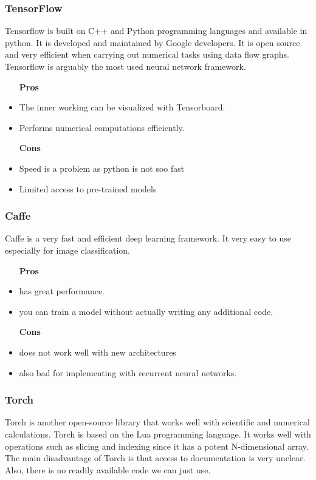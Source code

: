 \documentclass[12pt, a4paper,oneside]{report}
\begin{document}
\subsubsection{TensorFlow}
Tensorflow is built on C++ and Python programming languages and available in python. It is developed and maintained by Google developers.  It is open source and very efficient when carrying out numerical tasks using data flow graphs. Tensorflow is arguably the most used neural network framework.

\begin{itemize}
	\item [\textbf{Pros}]
	\item The inner working can be visualized with Tensorboard.
	\item Performs numerical computations efficiently.
	
	\item [\textbf{Cons}]
	\item Speed is a problem as python is not soo fast
	\item Limited access to pre-trained models
\end{itemize}

\subsubsection{Caffe}
Caffe is a very fast and efficient deep learning framework. It very easy to use especially for image classification.

\begin{itemize}
	\item [\textbf{Pros}]
	\item has great performance.
	\item you can train a model without actually writing any additional code.
	
	\item [\textbf{Cons}]
	\item does not work well with new architectures
	\item also bad for implementing with recurrent neural networks.
\end{itemize}

\subsubsection{Torch}
Torch is another open-source library that works well with scientific and numerical calculations. Torch is based on the Lua programming language. It works well with operations such as slicing and indexing since it has a potent N-dimensional array. The main disadvantage of Torch is that access to documentation is very unclear. Also, there is no readily available code we can just use.
\end{document}

